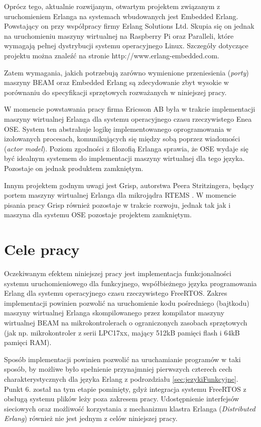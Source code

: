 Oprócz tego, aktualnie rozwijanym, otwartym projektem związanym z uruchomieniem Erlanga na systemach wbudowanych jest Embedded Erlang. Powstający on przy współpracy firmy Erlang Solutions Ltd. Skupia się on jednak na uruchomieniu maszyny wirtualnej na Raspberry Pi oraz Paralleli, które wymagają pełnej dystrybucji systemu operacyjnego Linux. Szczegóły dotyczące projektu można znaleźć na stronie http://www.erlang-embedded.com.


Zatem wymagania, jakich potrzebują zarówno wymienione przeniesienia (\emph{porty}) maszyny BEAM oraz Embedded Erlang są zdecydowanie zbyt wysokie w porównaniu do specyfikacji sprzętowych rozważanych w niniejszej pracy.


W momencie powstawania pracy firma Ericsson AB była w trakcie implementacji maszyny wirtualnej Erlanga dla systemu operacyjnego czasu rzeczywistego Enea OSE. System ten abstrahuje logikę implementowanego oprogramowania w izolowanych procesach, komunikujących się między sobą poprzez wiadomości (\emph{actor model}). Poziom zgodności z filozofią Erlanga sprawia, że OSE wydaje się być idealnym systemem do implementacji maszyny wirtualnej dla tego języka. Pozostaje on jednak produktem zamkniętym.

Innym projektem godnym uwagi jest Grisp, autorstwa Peera Stritzingera, będący portem maszyny wirtualnej Erlanga dla mikrojądra RTEMS \cite{Stritzinger2013}. W momencie pisania pracy Grisp również pozostaje w trakcie rozwoju, jednak tak jak i maszyna dla systemu OSE pozostaje projektem zamkniętym.

\section{Cele pracy}
\label{sec:celePracy}

Oczekiwanym efektem niniejszej pracy jest implementacja funkcjonalności systemu uruchomieniowego dla funkcyjnego, współbieżnego języka programowania Erlang dla systemu operacyjnego czasu rzeczywistego FreeRTOS.
Zakres implementacji powinien pozwolić na uruchomienie kodu pośredniego (bajtkodu) maszyny wirtualnej Erlanga skompilowanego przez kompilator maszyny wirtualnej BEAM na mikrokontrolerach o ograniczonych zasobach sprzętowych (jak np. mikrokontroler z serii LPC17xx, mający 512kB pamięci flash i 64kB pamięci RAM).

Sposób implementacji powinien pozwolić na uruchamianie programów w taki sposób, by możliwe było spełnienie przynajmniej pierwszych czterech cech charakterystycznych dla języka Erlang z podrozdziału \ref{sec:jezykiFunkcyjne}. Punkt 6. został na tym etapie pominięty, gdyż integracja systemu FreeRTOS z obsługą systemu plików leży poza zakresem pracy. Udostępnienie interfejsów sieciowych oraz możliwość korzystania z mechanizmu klastra Erlanga (\emph{Distributed Erlang}) również nie jest jednym z celów niniejszej pracy.

